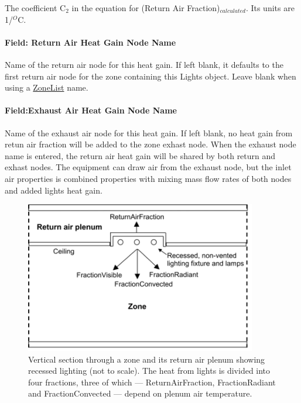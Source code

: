 The coefficient C\(_{2}\) in the equation for (Return Air Fraction)\(_{calculated}\). Its units are 1/\(^{O}\)C.

\paragraph{Field: Return Air Heat Gain Node Name}\label{field-return-air-heat-gain-node-name}

Name of the return air node for this heat gain. If left blank, it defaults to the first return air node for the zone containing this Lights object. Leave blank when using a \hyperref[zonelist]{ZoneList} name.

\paragraph{Field:Exhaust Air Heat Gain Node Name}\label{field-exhaust-air-heat-gain-node-name}

Name of the exhaust air node for this heat gain. If left blank, no heat gain from retun air fraction will be added to the zone exhast node. When the exhaust node name is entered, the return air heat gain will be shared by both return and exhast nodes. The equipment can draw air from the exhaust node, but the inlet air properties is combined properties with mixing mass flow rates of both nodes and added lights heat gain.

\begin{figure}[hbtp] %
\centering
\includegraphics[width=0.9\textwidth, height=0.9\textheight, keepaspectratio=true]{media/image087.png}
\caption{Vertical section through a zone and its return air plenum showing recessed lighting (not to scale). The heat from lights is divided into four fractions, three of which --- ReturnAirFraction, FractionRadiant and FractionConvected --- depend on plenum air temperature. \protect \label{fig:vertical-section-through-a-zone-and-its}}
\end{figure}


